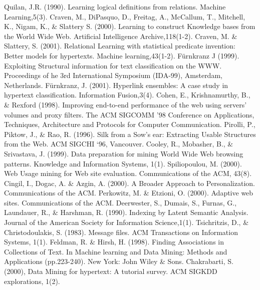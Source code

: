 \documentclass{article}
\begin{document}
\newline
[13] Quilan, J.R. (1990). Learning logical definitions from relations. 
Machine Learning,5(3).
\newline
[14] Craven, M., DiPasquo, D., Freitag, A., McCallum, T., Mitchell,  K., Nigam, K., \& Slattery S. (2000). Learning to construct Knowledge bases from the World Wide Web. Artificial Intelligence Archive,118(1-2).
\newline
[15] Craven, M. \& Slattery, S. (2001). Relational Learning with statistical predicate invention: Better models for hypertexts. Machine learning,43(1-2).
\newline
[16] Fürnkranz J (1999). Exploiting Structural information for text classification on the WWW. Proceedings of he 3rd International Symposium (IDA-99), Amsterdam, Netherlands.
\newline
[17] Fürnkranz, J. (2001). Hyperlink ensembles: A case study in hypertext classification. Information Fusion,3(4).
\newline
[18] Cohen, E., Krishnamurthy, B., \& Rexford (1998). Improving end-to-end performance of the web using servers’ volumes and proxy filters. The ACM SIGCOMM ’98 Conference on Applications, Techniques, Architecture and Protocols for Computer Communication.
\newline
[19] Pirolli, P., Piktow, J., \& Rao, R. (1996). Silk from a Sow’s ear: Extracting Usable Structures from the Web. ACM SIGCHI ‘96, Vancouver.
\newline
[20] Cooley, R., Mobasher, B., \& Srivastava, J. (1999). Data preparation for mining World Wide Web browsing patterns. Knowledge and Information Systems, 1(1).
\newline
[21] Spiliopoulou, M. (2000). Web Usage mining for Web site evaluation. Communications of the ACM, 43(8).
\newline
[22] Cingil, I., Dogac, A. \& Azgin, A. (2000). A Broader Approach to Personalization. Communications of the ACM.
\newline
[23] Perkowitz, M. \& Etzioni, O. (2000). Adaptive  web sites. Communications of the ACM.
\pagebreak
\newline
[24] Deerwester, S., Dumais, S., Furnas, G., Laundauer, R., \& Harshman, R. (1990). Indexing by Latent Semantic Analysis. Journal of the American Society for Information Science,1(1).
\newline
[25] Tsichritzis, D., \& Christodoulakis, S. (1983). Message files. ACM Transactions on Information Systems, 1(1).
\newline
[26] Feldman, R. \& Hirsh, H. (1998). Finding Associations in Collections of Text. In Machine learning and Data Mining: Methods and Applications (pp.223-240). New York: John Wiley \& Sons.
\newline
[27] Chakrabarti, S. (2000), Data Mining for hypertext: A tutorial survey. ACM SIGKDD explorations, 1(2).
\newline
\pagebreak
\end{document}
